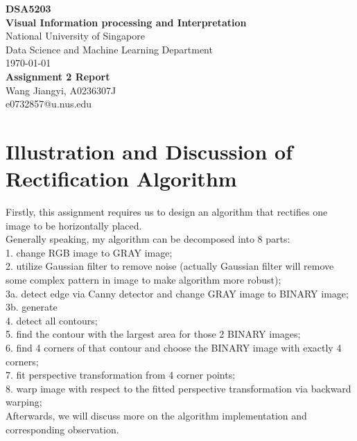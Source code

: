 \documentclass{article}
\begin{document}
\begin{titlepage}
	\begin{center}
		\vspace*{1cm}
		\Large{\textbf{DSA5203}}\\
		\Large{\textbf{Visual Information processing and Interpretation}}\\
		\vspace{1cm}
		\small
		National University of Singapore\\
		Data Science and Machine Learning Department\\
		\today \\
		\vfill
		\LARGE{\textbf{Assignment 2 Report}}\\[5mm]
		\vfill
		\small
		Wang Jiangyi, A0236307J\\
		e0732857@u.nus.edu
	\end{center}
\end{titlepage}
\section{Illustration and Discussion of Rectification Algorithm}
Firstly, this assignment requires us to design an algorithm that rectifies one image to be horizontally placed.
\vspace{4pt}
\\
Generally speaking, my algorithm can be decomposed into 8 parts:
\\
1. change RGB image to GRAY image;
\\
2. utilize Gaussian filter to remove noise (actually Gaussian filter will remove some complex pattern in image to make algorithm more robust);
\\
3a. detect edge via Canny detector and change GRAY image to BINARY image;
\\
3b. generate 
\\
4. detect all contours;
\\
5. find the contour with the largest area for those 2 BINARY images;
\\
6. find 4 corners of that contour and choose the BINARY image with exactly 4 corners;
\\
7. fit perspective transformation from 4 corner points;
\\
8. warp image with respect to the fitted perspective transformation via backward warping;
\vspace{4pt}
\\ 
Afterwards, we will discuss more on the algorithm implementation and corresponding observation.
\end{document}

